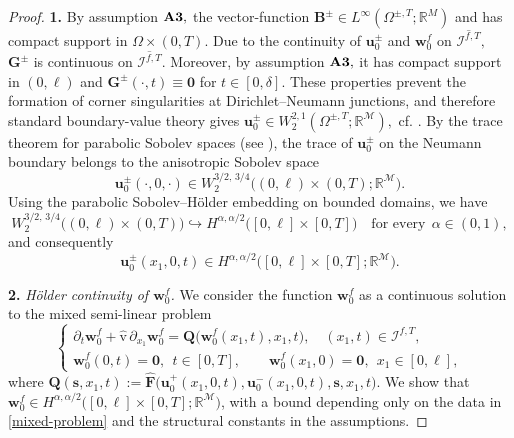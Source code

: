 \documentclass[reqno]{amsart}            %
\numberwithin{equation}{section}
\begin{document}
\begin{proof} {\bf 1.}
		By assumption ${\bf A3},$ the vector-function $\mathbf{B}^\pm \in L^\infty(\Omega^{\pm, T}; \mathbb{R}^M)$ and has compact support in $\Omega\times(0,T).$ Due to the continuity of $\mathbf{u}_0^\pm$ and $\mathbf{w}_0^f$ on $\overline{\mathcal{I}^{f,T}},$
		$\mathbf{G}^\pm$ is continuous on $\overline{\mathcal{I}^{f, T}}.$ Moreover, by assumption ${\bf A3},$ it has compact support in $(0,\ell)$ and $\mathbf{G}^\pm(\cdot,t)\equiv\mathbf{0}$ for $t\in[0,\delta].$ These properties prevent the formation of corner singularities at Dirichlet–Neumann junctions, and therefore standard boundary-value theory gives
		$
		\mathbf{u}_0^\pm\in W^{2,1}_2(\Omega^{\pm,T};\mathbb{R}^\mathcal{M}),
		$
		cf. \cite{solonnikov1971boundary,grisvard1985elliptic}.
		By the trace theorem for parabolic Sobolev spaces (see \cite{Lad_Sol_Ura_1968,lions1968non}), the trace of $\mathbf{u}_0^\pm$ on the Neumann boundary belongs to the anisotropic Sobolev space
		\[
		\mathbf{u}_0^\pm(\cdot,0,\cdot)\in W^{3/2,\,3/4}_2\big((0,\ell)\times(0,T);\mathbb{R}^\mathcal{M}\big).
		\]
		Using the parabolic Sobolev–Hölder embedding on bounded domains, we have 
		\[
		W^{3/2,\,3/4}_2\big((0,\ell)\times(0,T)\big)\hookrightarrow H^{\alpha,\alpha/2}\big([0,\ell]\times[0,T]\big) \quad \text{for every} \ \ \alpha\in(0,1),
		\]
		and consequently
		\begin{equation}\label{Hord-1}
			\mathbf{u}_0^\pm(x_1,0,t)\in H^{\alpha,\alpha/2}\big([0,\ell]\times[0,T];\mathbb{R}^\mathcal{M}\big).
		\end{equation}
		
		
		\smallskip
		\noindent
		\textbf{2.} \emph{H\"older continuity of $\mathbf{w}^f_0$.} We consider the function $\mathbf{w}^f_0$ as a continuous solution to the mixed semi-linear problem
		\begin{equation}\label{mixed-problem}
			\left\{\begin{array}{l}
				\partial_t \mathbf{w}^f_0  + \hat{\mathrm{v}} \, \partial_{x_1} \mathbf{w}^f_0  = \mathbf{Q}\big(\mathbf{w}^f_0(x_1,t), x_1, t\big), \quad 
				(x_1,t) \in \mathcal{I}^{f, T},
				\\[3pt]
				\mathbf{w}^f_0(0,t)= \mathbf{0}, \ \ t\in [0,T], \qquad \mathbf{w}^f_0(x_1,0)= \mathbf{0}, \ \ x_1\in [0, \ell],
			\end{array}\right.
		\end{equation}
		where 
		$
		\mathbf{Q}(\mathbf{s}, x_1, t) := \widehat{\mathbf {F}}\big(\mathbf{u}^+_0(x_1,0,t), \mathbf{u}^-_0(x_1,0,t), \mathbf{s}, x_1, t\big).
		$
		We show that $\mathbf{w}^f_0\in H^{\alpha,\alpha/2}\big([0,\ell]\times[0,T];\mathbb{R}^\mathcal{M}\big)$, with a bound depending only on the data in \eqref{mixed-problem} and the structural constants in the assumptions.
		

\end{proof}
\end{document}
